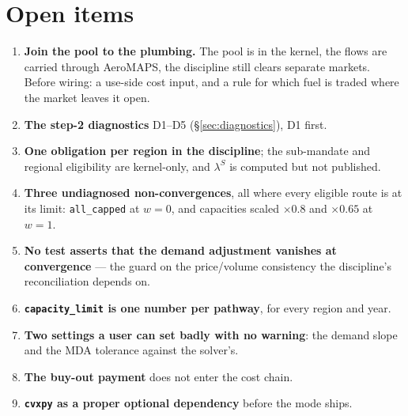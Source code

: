 \documentclass[11pt,a4paper]{article}
\newcommand{\var}[1]{\texttt{\small #1}}
\begin{document}
\section{Open items}
\label{sec:open}

\begin{enumerate}[leftmargin=*,itemsep=2pt]
  \item \textbf{Join the pool to the plumbing.} The pool is in the kernel, the flows are carried
    through AeroMAPS, the discipline still clears separate markets. Before wiring: a use-side cost
    input, and a rule for which fuel is traded where the market leaves it open.
  \item \textbf{The step-2 diagnostics} D1--D5 (\S\ref{sec:diagnostics}), D1 first.
  \item \textbf{One obligation per region in the discipline}; the sub-mandate and regional
    eligibility are kernel-only, and $\lambda^{S}$ is computed but not published.
  \item \textbf{Three undiagnosed non-convergences}, all where every eligible route is at its
    limit: \var{all\_capped} at $w=0$, and capacities scaled $\times0.8$ and $\times0.65$ at $w=1$.
  \item \textbf{No test asserts that the demand adjustment vanishes at convergence} --- the
    guard on the price/volume consistency the discipline's reconciliation depends on.
  \item \textbf{\var{capacity\_limit} is one number per pathway}, for every region and year.
  \item \textbf{Two settings a user can set badly with no warning}: the demand slope and the MDA
    tolerance against the solver's.
  \item \textbf{The buy-out payment} does not enter the cost chain.
  \item \textbf{\var{cvxpy} as a proper optional dependency} before the mode ships.
\end{enumerate}
\end{document}
